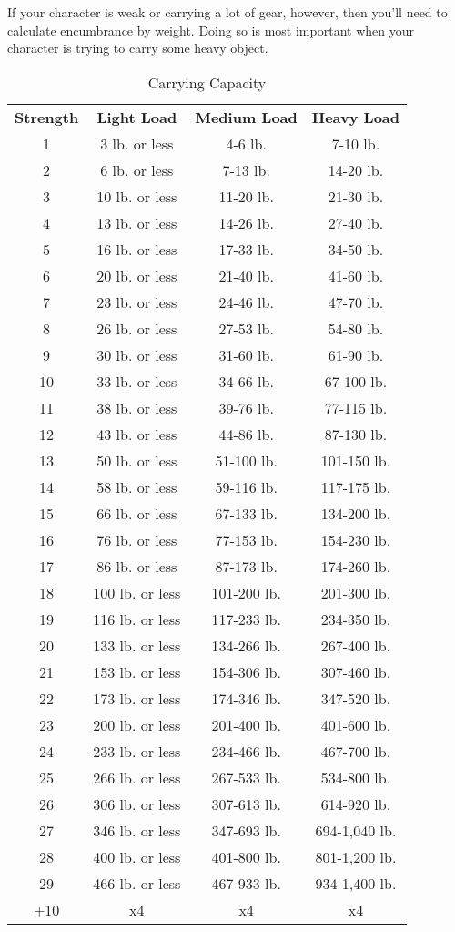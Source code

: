 If your character is weak or carrying a lot of gear, however, then you'll need to calculate encumbrance by weight. Doing so is most important when your character is trying to carry some heavy object.
								

\begin{table}[htb]
\sffamily
{}
\caption{Carrying Capacity}
\centering
\begin{tabular}{c c c c}
\textbf{Strength} & \textbf{Light Load} & \textbf{Medium Load} & \textbf{Heavy Load}\\
1 & 3 lb. or less & 4-6 lb. & 7-10 lb.\\
2 & 6 lb. or less & 7-13 lb. & 14-20 lb.\\
3 & 10 lb. or less & 11-20 lb. & 21-30 lb.\\
4 & 13 lb. or less & 14-26 lb. & 27-40 lb.\\
5 & 16 lb. or less & 17-33 lb. & 34-50 lb.\\
6 & 20 lb. or less & 21-40 lb. & 41-60 lb.\\
7 & 23 lb. or less & 24-46 lb. & 47-70 lb.\\
8 & 26 lb. or less & 27-53 lb. & 54-80 lb.\\
9 & 30 lb. or less & 31-60 lb. & 61-90 lb.\\
10 & 33 lb. or less & 34-66 lb. & 67-100 lb.\\
11 & 38 lb. or less & 39-76 lb. & 77-115 lb.\\
12 & 43 lb. or less & 44-86 lb. & 87-130 lb.\\
13 & 50 lb. or less & 51-100 lb. & 101-150 lb.\\
14 & 58 lb. or less & 59-116 lb. & 117-175 lb.\\
15 & 66 lb. or less & 67-133 lb. & 134-200 lb.\\
16 & 76 lb. or less & 77-153 lb. & 154-230 lb.\\
17 & 86 lb. or less & 87-173 lb. & 174-260 lb.\\
18 & 100 lb. or less & 101-200 lb. & 201-300 lb.\\
19 & 116 lb. or less & 117-233 lb. & 234-350 lb.\\
20 & 133 lb. or less & 134-266 lb. & 267-400 lb.\\
21 & 153 lb. or less & 154-306 lb. & 307-460 lb.\\
22 & 173 lb. or less & 174-346 lb. & 347-520 lb.\\
23 & 200 lb. or less & 201-400 lb. & 401-600 lb.\\
24 & 233 lb. or less & 234-466 lb. & 467-700 lb.\\
25 & 266 lb. or less & 267-533 lb. & 534-800 lb.\\
26 & 306 lb. or less & 307-613 lb. & 614-920 lb.\\
27 & 346 lb. or less & 347-693 lb. & 694-1,040 lb.\\
28 & 400 lb. or less & 401-800 lb. & 801-1,200 lb.\\
29 & 466 lb. or less & 467-933 lb. & 934-1,400 lb.\\
+10 & x4 & x4 & x4\\
\end{tabular}
\end{table}

